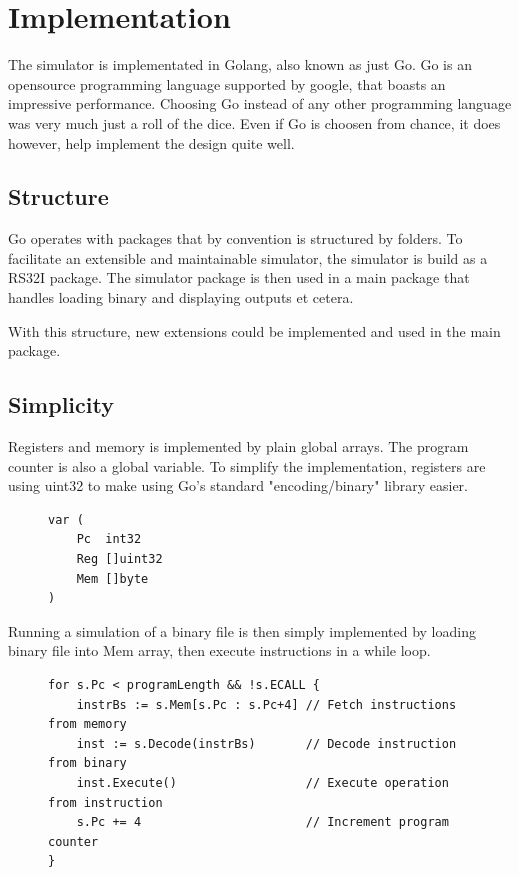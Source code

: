\section{Implementation}

The simulator is implementated in Golang, also known as just Go. 
Go is an opensource programming language supported by google, that boasts an impressive performance.
Choosing Go instead of any other programming language was very much just a roll of the dice.
Even if Go is choosen from chance, it does however, help implement the design quite well. 

\subsection{Structure}
Go operates with packages that by convention is structured by folders. 
To facilitate an extensible and maintainable simulator, the simulator is build as a RS32I package.
The simulator package is then used in a main package that handles loading binary and displaying outputs et cetera.


With this structure, new extensions could be implemented and used in the main package.

\subsection{Simplicity}

Registers and memory is implemented by plain global arrays.
The program counter is also a global variable.
To simplify the implementation, registers are using uint32 to make using Go's standard "encoding/binary" library easier.

\begin{figure}[h]
\begin{verbatim}
var (
    Pc  int32
    Reg []uint32
    Mem []byte
)
\end{verbatim}
\end{figure}

Running a simulation of a binary file is then simply implemented by loading binary file into Mem array, then execute instructions in a while loop.
\begin{figure}[h]
\begin{verbatim}
for s.Pc < programLength && !s.ECALL {
    instrBs := s.Mem[s.Pc : s.Pc+4] // Fetch instructions from memory
    inst := s.Decode(instrBs)       // Decode instruction from binary
    inst.Execute()                  // Execute operation from instruction
    s.Pc += 4                       // Increment program counter
}
\end{verbatim}
\end{figure}


